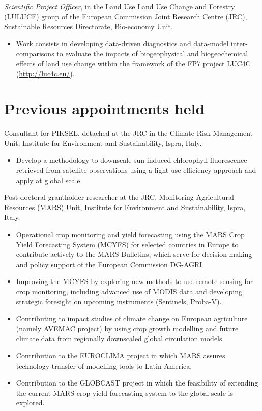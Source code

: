 \documentclass[11pt, a4paper]{article} %
\newcommand{\years}[1]{\marginnote{\scriptsize #1}} %
\begin{document}
\years{04/2015-present} \emph{Scientific Project Officer}, in the Land Use Land Use Change and Forestry (LULUCF) group of the European Commission Joint Research Centre (JRC), Sustainable Resources Directorate, Bio-economy Unit.  %
\begin{itemize}
\item Work consists in developing data-driven diagnostics and data-model inter-comparisons to evaluate the impacts of biogeophysical and biogeochemical effects of land use change within the framework of the FP7 project LUC4C (\href{http://luc4c.eu/}{http://luc4c.eu/}).
\end{itemize}



\section*{Previous appointments held}

\years{02/2014-03/2015} Consultant for PIKSEL, detached at the JRC in the Climate Risk Management Unit, Institute for Environment and Sustainability, Ispra, Italy.
\begin{itemize}
\item Develop a methodology to downscale sun-induced chlorophyll fluorescence retrieved from satellite observations using a light-use efficiency approach and apply at global scale.
\end{itemize}

\years{02/2011-02/2014} Post-doctoral grantholder researcher at the JRC, Monitoring Agricultural Resources (MARS) Unit, Institute for Environment and Sustainability, Ispra, Italy. 
\begin{itemize}
\item Operational crop monitoring and yield forecasting using the MARS Crop Yield Forecasting System (MCYFS) for selected countries in Europe to contribute actively to the MARS Bulletins, which serve for decision-making and policy support of the European Commission DG-AGRI.
\item Improving the MCYFS by exploring new methods to use remote sensing for crop monitoring, including advanced use of MODIS data and developing strategic foresight on upcoming instruments (Sentinels, Proba-V).
\item Contributing to impact studies of climate change on European agriculture (namely AVEMAC project) by using crop growth modelling and future climate data from regionally downscaled global circulation models.
\item Contribution to the EUROCLIMA project in which MARS assures technology transfer of modelling tools to Latin America.
\item Contribution to the GLOBCAST project in which the feasibility of extending the current MARS crop yield forecasting system to the global scale is explored.
\end{itemize}
\end{document}
